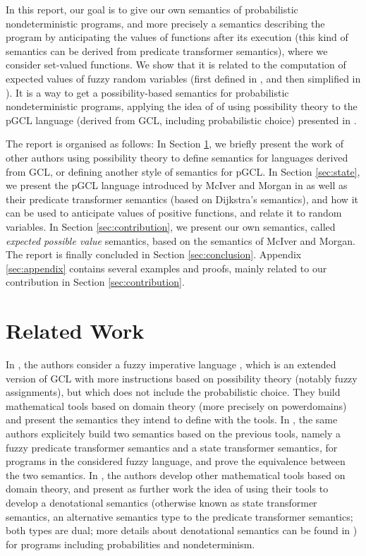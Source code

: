 \documentclass[a4paper,10pt]{llncs}
\begin{document}
In this report, our goal is to give our own semantics of probabilistic nondeterministic programs, and more precisely a semantics describing the program by anticipating the values of functions after its execution (this kind of semantics can be derived from predicate transformer semantics), where we consider set-valued functions. We show that it is related to the computation of expected values of fuzzy random variables (first defined in \cite{PuriRal86}, and then simplified in \cite{Shapiro09}). It is a way to get a possibility-based semantics for probabilistic nondeterministic programs, applying the idea of \cite{WuChen08,WuChen11,WuChen12} of using possibility theory to the pGCL language (derived from GCL, including probabilistic choice) presented in \cite{McIver05}.\bigskip

The report is organised as follows: In Section \ref{sec:related}, we briefly present the work of other authors using possibility theory to define semantics for languages derived from GCL, or defining another style of semantics for pGCL. In Section \ref{sec:state}, we present the pGCL language introduced by McIver and Morgan in \cite{McIver05} as well as their predicate transformer semantics (based on Dijkstra's semantics), and how it can be used to anticipate values of positive functions, and relate it to random variables. In Section \ref{sec:contribution}, we present our own semantics, called \emph{expected possible value} semantics, based on the semantics of McIver and Morgan. The report is finally concluded in Section \ref{sec:conclusion}. Appendix \ref{sec:appendix} contains several examples and proofs, mainly related to our contribution in Section \ref{sec:contribution}.

\section{Related Work}
\label{sec:related}

In \cite{WuChen08}, the authors consider a fuzzy imperative language \cite{Bueno93,Bueno97}, which is an extended version of GCL with more instructions based on possibility theory (notably fuzzy assignments), but which does not include the probabilistic choice. They build mathematical tools based on domain theory (more precisely on powerdomains) and present the semantics they intend to define with the tools.
In \cite{WuChen12}, the same authors explicitely build two semantics based on the previous tools, namely a fuzzy predicate transformer semantics and a state transformer semantics, for programs in the considered fuzzy language, and prove the equivalence between the two semantics. In \cite{Tix09}, the authors develop other mathematical tools based on domain theory, and present as further work the idea of using their tools to develop a denotational semantics (otherwise known as state transformer semantics, an alternative semantics type to the predicate transformer semantics; both types are dual; more details about denotational semantics can be found in \cite{Stoy77}) for programs including probabilities and nondeterminism. 
\end{document}
